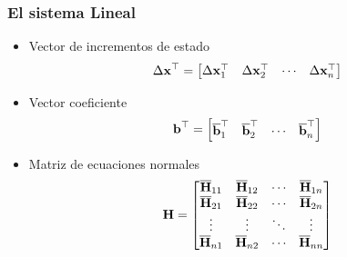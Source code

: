 \begin{frame}
	\frametitle{El sistema Lineal}
	
	\begin{itemize}
		\item Vector de incrementos de estado
		\begin{equation*}
			\Delta\boldsymbol{\mathbf{x}}^{\top} =
			\begin{bmatrix}
			\Delta\boldsymbol{\mathbf{x}}_{1}^{\top}	& \Delta\boldsymbol{\mathbf{x}}_{2}^{\top} & \cdots & \Delta\boldsymbol{\mathbf{x}}_{n}^{\top}
			\end{bmatrix}
		\end{equation*}
	\item Vector coeficiente
		\begin{equation*}
			\boldsymbol{\mathbf{b}}^{\top} =
			\begin{bmatrix}
				\overline{\boldsymbol{\mathbf{b}}}_{1}^{\top} & \overline{\boldsymbol{\mathbf{b}}}_{2}^{\top} & \cdots & \overline{\boldsymbol{\mathbf{b}}}_{n}^{\top}
			\end{bmatrix}
		\end{equation*}
	\item Matriz de ecuaciones normales
		\begin{equation*}
			\boldsymbol{\mathbf{H}} =
			\begin{bmatrix}
			\overline{\boldsymbol{\mathbf{H}}}_{11} & \overline{\boldsymbol{\mathbf{H}}}_{12} & \cdots & \overline{\boldsymbol{\mathbf{H}}}_{1n}\\
			\overline{\boldsymbol{\mathbf{H}}}_{21} & \overline{\boldsymbol{\mathbf{H}}}_{22} & \cdots & \overline{\boldsymbol{\mathbf{H}}}_{2n}\\
			\vdots & \vdots & \ddots & \vdots\\
			\overline{\boldsymbol{\mathbf{H}}}_{n1} & \overline{\boldsymbol{\mathbf{H}}}_{n2} & \cdots & \overline{\boldsymbol{\mathbf{H}}}_{nn}\\
			\end{bmatrix}
		\end{equation*}
	\end{itemize}

\end{frame}


